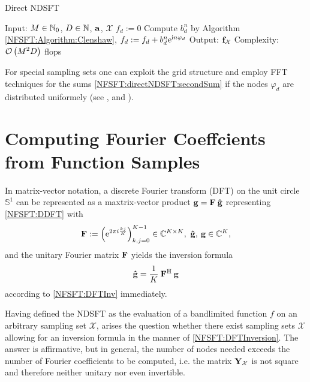 \begin{algorithm}[tb]
  \caption{Direct NDSFT}
  \label{NFSFT:directDSFT}    
  \begin{algorithmic}
    \STATE  Input: $M \in \mathbb{N}_{0}$, $D \in \mathbb{N}$, $\mathbf{a}$, $\mathcal{X}$
    \STATE
      \STATE $f_{d} := 0$
        \STATE Compute $b^{n}_d$ by Algorithm \ref{NFSFT:Algorithm:Clenshaw},
        \STATE $f_{d} := f_{d} + b^n_d \mbox{\rm{e}}^{\mbox{\scriptsize\rm{i}} n \varphi_{d}}$
      \ENDFOR
    \ENDFOR
    \STATE
    \STATE Output: $\mathbf{f}_{\mathcal{X}}$
    \STATE Complexity: $\mathcal{O}\left(M^2 D\right)$ flops
\end{algorithmic}
\end{algorithm}

For special sampling sets one can exploit the grid 
structure and employ FFT techniques for the sums \eqref{NFSFT:directNDSFT:secondSum} if the nodes $\varphi_{d}$ are distributed uniformely 
(see \cite{drhe}, \cite{postta97} and \cite{kupo02}). 


\section{Computing Fourier Coeffcients from Function Samples}
\label{NFSFT:iDSFT}
In matrix-vector notation, a discrete Fourier transform (DFT) on the unit circle $\mathbb{S}^1$ can be represented as a 
maxtrix-vector product $\mathbf{g} = \mathbf{F} \: \mathbf{\hat{g}}$ representing \eqref{NFSFT:DDFT} with
\[
 \mathbf{F} := \left(\mbox{\rm{e}}^{2 \pi i \frac{kj}{K}}\right)_{k,j = 0}^{K-1} \in 
 \mathbb{C}^{K \times K},\ \mathbf{\hat{g}},\:\mathbf{g} \in \mathbb{C}^{K},
\]
and the unitary Fourier matrix $\mathbf{F}$ yields the inversion formula
\begin{equation}
  \label{NFSFT:DFTInversion}
  \mathbf{\hat{g}} = \frac{1}{K} \: \mathbf{F}^{\text{\rm{H}}} \: \mathbf{g}
\end{equation}
according to \eqref{NFSFT:DFTInv} immediately. 

Having defined the NDSFT as the evaluation of a bandlimited function $f$ on an arbitrary
sampling set $\mathcal{X}$, arises the question 
whether there exist sampling sets $\mathcal{X}$ allowing for an inversion formula in the manner of 
\eqref{NFSFT:DFTInversion}.
The answer is affirmative, but in general, the number of nodes needed exceeds the number of Fourier coefficients to be computed, 
i.e. the matrix $\mathbf{Y}_{\mathcal{X}}$ is not square and therefore neither unitary nor even invertible.

